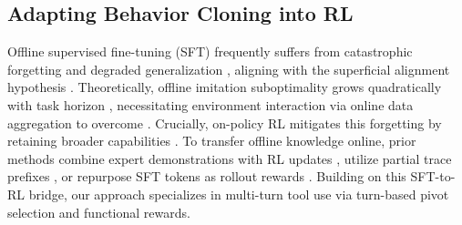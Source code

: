 \subsection{Adapting Behavior Cloning into RL}
Offline supervised fine-tuning (SFT) frequently suffers from catastrophic forgetting and degraded generalization \citep{luo2023empiricalCF,li2024revisitingCF,imanov2026mechanisticCF,kirkpatrick2017ewc,li2016lwf}, aligning with the superficial alignment hypothesis \citep{zhou2023limaalignment,vergarabrowne2026sahcomplexity,raghavendra2024revisitingSAH}. Theoretically, offline imitation suboptimality grows quadratically with task horizon \citep{rajaraman2020towardfundamentallimitsimitation}, necessitating environment interaction via online data aggregation to overcome \citep{ross2011dagger,swamy2022minimaxoptimalonlineimitation}. 
Crucially, on-policy RL mitigates this forgetting by retaining broader capabilities \citep{shenfeld2025rlsrazoronlinereinforcement,chen2025retainingdoingroleonpolicy}. To transfer offline knowledge online, prior methods combine expert demonstrations with RL updates \citep{uchendu2022jumpstartreinforcementlearning,hester2018dqfd}, utilize partial trace prefixes \citep{setlur2026prefixrl}, or repurpose SFT tokens as rollout rewards \citep{ming2025onetokenrollout}. Building on this SFT-to-RL bridge, our approach specializes in multi-turn tool use via turn-based pivot selection and functional rewards.